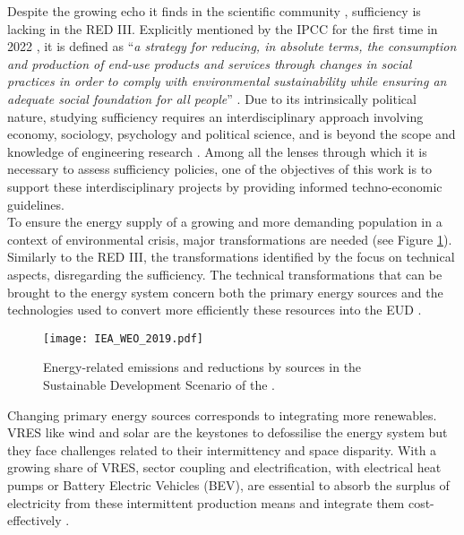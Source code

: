 Despite the growing echo it finds in the scientific community \cite{o2018good}, sufficiency is lacking in the RED III. Explicitly mentioned by the IPCC for the first time in 2022 \cite{IPCC2022}, it is defined as ``\emph{a strategy for reducing, in absolute terms, the consumption and production of end-use products and services through changes in social practices in order to comply with environmental sustainability while ensuring an adequate social foundation for all people}'' \cite{lage2023citizens}. Due to its intrinsically political nature, studying sufficiency requires an interdisciplinary approach involving economy, sociology, psychology and political science, and is beyond the scope and knowledge of engineering research \cite{schmidt2015interdisciplinary}. Among all the lenses through which it is necessary to assess sufficiency policies, one of the objectives of this work is to support these interdisciplinary projects by providing informed techno-economic guidelines.\\

\noindent
To ensure the energy supply of a growing and more demanding population in a context of environmental crisis, major transformations are needed (see Figure \ref{fig:intro:IEA_WEO_2019}). Similarly to the RED III, the transformations identified by the \citet{iea2020world} focus on technical aspects, disregarding the sufficiency.  The technical transformations that can be brought to the energy system concern both the primary energy sources and the technologies used to convert more efficiently these resources into the \gls{EUD} \cite{iea2020world,luderer2018residual}. 

\begin{figure}[ht!]
\centering
\texttt{[image: IEA\_WEO\_2019.pdf]}
\caption{Energy-related  emissions and reductions by sources in the Sustainable Development Scenario of the \citet{iea2020world}.}
\label{fig:intro:IEA_WEO_2019}
\end{figure}

Changing primary energy sources corresponds to integrating more renewables. \gls{VRES} like wind and solar are the keystones to defossilise the energy system but they face challenges related to their intermittency and space disparity.  With a growing share of \gls{VRES}, sector coupling and electrification, with electrical heat pumps or Battery Electric Vehicles (BEV), are essential to absorb the surplus of electricity from these intermittent production means \cite{robinius2017linking} and integrate them cost-effectively \cite{brown2018response, limpensECOS2021}. 

